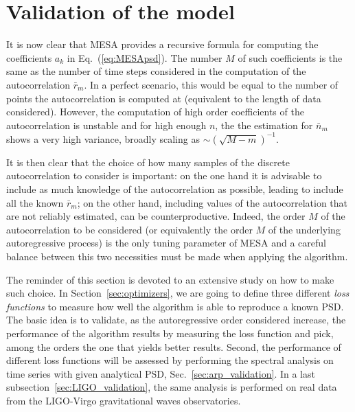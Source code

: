 \documentclass[twocolumn,showpacs,preprintnumbers,nofootinbib,prd,
superscriptaddress,10pt]{revtex4-1}
\begin{document}
\section{Validation of the model}
It is now clear that MESA provides a recursive formula for computing the coefficients $a_k$ in Eq.~(\ref{eq:MESApsd}). The number $M$ of such coefficients is the same as the number of time steps considered in the computation of the autocorrelation $\bar{r}_m$. In a perfect scenario, this would be equal to the number of points the autocorrelation is computed at (equivalent to the length of data considered). However, the computation of high order coefficients of the autocorrelation is unstable and for high enough $n$, the the estimation for  $\bar{n}_m$ shows a very high variance, broadly scaling as $\sim \left(\sqrt{M - m}\right)^{-1}$.


It is then clear that the choice of how many samples of the discrete autocorrelation to consider is important: 
on the one hand it is advisable to include as much knowledge of the autocorrelation as possible, leading to include all the known $\bar{r}_m$; on the other hand, including values of the autocorrelation that are not reliably estimated, can be counterproductive.
Indeed, the order $M$ of the autocorrelation to be considered (or equivalently the order $M$ of the underlying autoregressive process) is the only tuning parameter of MESA and a careful balance between this two necessities must be made when applying the algorithm.

The reminder of this section is devoted to an extensive study on how to make such choice.
In Section~\ref{sec:optimizers}, we are going to define three different \textit{loss functions} to measure how well the 
algorithm is able to reproduce a known PSD.
The basic idea is to validate, as the autoregressive order considered increase, the performance of the algorithm results 
by measuring the loss function and pick, among the orders the one that yields better results.
Second, the performance of different loss functions will be assessed by performing the spectral analysis on time series with given analytical PSD, Sec.~\ref{sec:arp_validation}.
In a last subsection~\ref{sec:LIGO_validation}, the same analysis is performed on real data from the LIGO-Virgo gravitational waves observatories.
\end{document}
